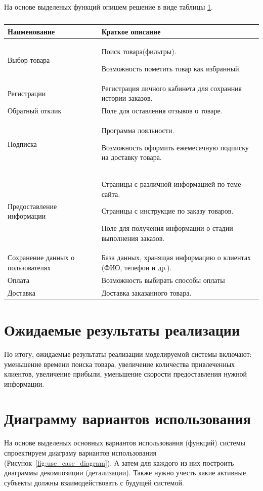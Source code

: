 На основе выделеных функций опишем решение
в виде таблицы \ref{table:desc_of_elements}.
\begin{table}[h!tp]
	\caption{}
	\label{table:desc_of_elements}
	\begin{tabular}{|p{}|p{}|}
		\hline Наименование & Краткое описание\\ \hline
		Выбор товара & Поиск товара(фильтры).\par
			Возможность пометить товар как избранный.\\ \hline
		Регистрации & Регистрация личного
			кабинета для сохранния истории заказов.\\ \hline
		Обратный отклик & Поле для оставления отзывов о товаре.\\ \hline
		Подписка & Программа лояльности.\par
			Возможность оформить ежемесячную
			подписку на доставку товара.\\ \hline
		Предоставление информации & Страницы с различной информацией
			по теме сайта.\par Страницы с инструкцие по заказу товаров.\par
			Поле для получения информации о стадии выполнения заказов.\\ \hline
		Сохранение данных о пользователях & База данных, хранящая информацию
			о клиентах (ФИО, телефон и др.).\\ \hline
		Оплата & Возможность выбирать способы оплаты\\ \hline
		Доставка & Доставка заказанного товара.\\ \hline
	\end{tabular}
\end{table}

\section{Ожидаемые результаты реализации}
По итогу, ожидаемые результаты реализации моделируемой
системы включают: уменьшение времени поиска товара,
увеличение количества привлеченных клиентов, увеличение прибыли, 
уменьшение скорости предоставления нужной информации.


\section{Диаграмму вариантов использования}
На основе выделеных основных вариантов использования (функций) системы
спроектируем диаграму вариантов использования
(Рисунок~\ref{fig:use_case_diagram}). А затем
для каждого из них построить диаграммы декомпозиции (детализации). 
Также нужно учесть какие активные субъекты должны взаимодействовать с
будущей системой.

